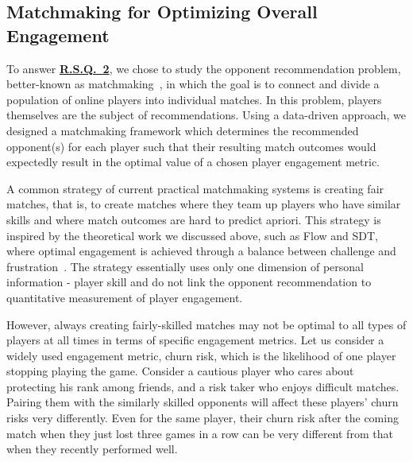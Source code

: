 \subsection{Matchmaking for Optimizing Overall Engagement}\label{sec:thesis_overview:oppo_recom}

To answer \hyperref[rq2]{\textbf{R.S.Q.~2}}, we chose to study the opponent recommendation problem, better-known as matchmaking~\citep{medler2011using}, in which the goal is to connect and divide a population of online players into individual matches. In this problem, players themselves are the subject of recommendations. Using a data-driven approach, we designed a matchmaking framework which determines the recommended opponent(s) for each player such that their resulting match outcomes would expectedly result in the optimal value of a chosen player engagement metric. 

A common strategy of current practical matchmaking systems is creating fair matches, that is, to create matches where they team up players who have similar skills and where match outcomes are hard to predict apriori. This strategy is inspired by the theoretical work we discussed above, such as Flow and SDT, where optimal engagement is achieved through a balance between challenge and frustration~\citep{sweetser2005gameflow,flow1990psychology,chen2007flow,graepel2006ranking}. The strategy essentially uses only one dimension of personal information - player skill and do not link the opponent recommendation to quantitative measurement of player engagement. 

However, always creating fairly-skilled matches may not be optimal to all types of players at all times in terms of specific engagement metrics. Let us consider a widely used engagement metric, churn risk, which is the likelihood of one player stopping playing the game. Consider a cautious player who cares about protecting his rank among friends, and a risk taker who enjoys difficult matches. Pairing them with the similarly skilled opponents will affect these players' churn risks very differently. Even for the same player, their churn risk after the coming match when they just lost three games in a row can be very different from that when they recently performed well. 

